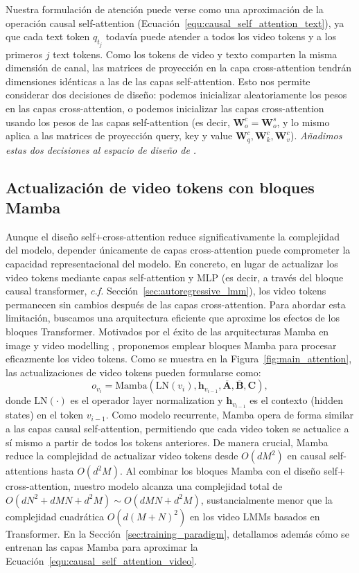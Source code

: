 Nuestra formulación de atención puede verse como una aproximación de la operación causal self-attention (Ecuación~\ref{equ:causal_self_attention_text}), ya que cada text token $q_{t_j}$ todavía puede atender a todos los video tokens y a los primeros $j$ text tokens. Como los tokens de video y texto comparten la misma dimensión de canal, las matrices de proyección en la capa cross-attention tendrán dimensiones idénticas a las de las capas self-attention. Esto nos permite considerar dos decisiones de diseño: podemos inicializar aleatoriamente los pesos en las capas cross-attention, o podemos inicializar las capas cross-attention usando los pesos de las capas self-attention (es decir, $\mathbf{W}_o^c=\mathbf{W}_o^s$, y lo mismo aplica a las matrices de proyección query, key y value $\mathbf{W}_q^c,\mathbf{W}_k^c,\mathbf{W}_v^c$). \textit{Añadimos estas dos decisiones al espacio de diseño de \model.}

\subsection{Actualización de video tokens con bloques Mamba}
Aunque el diseño self$+$cross-attention reduce significativamente la complejidad del modelo, depender únicamente de capas cross-attention puede comprometer la capacidad representacional del modelo. En concreto, en lugar de actualizar los video tokens mediante capas self-attention y MLP (es decir, a través del bloque causal transformer, \textit{c.f.} Sección~\ref{sec:autoregressive_lmm}), los video tokens permanecen sin cambios después de las capas cross-attention. Para abordar esta limitación, buscamos una arquitectura eficiente que aproxime los efectos de los bloques Transformer. Motivados por el éxito de las arquitecturas Mamba \cite{gu2023mamba, dao2024transformers} en image y video modelling \cite{zhu2024vision, liu2024vmamba, li2024videomamba}, proponemos emplear bloques Mamba para procesar eficazmente los video tokens. Como se muestra en la Figura~\ref{fig:main_attention}, las actualizaciones de video tokens pueden formularse como:
\begin{equation}
\label{equ:mamba}
    o_{v_i} = \mathrm{Mamba}(\mathrm{LN}(v_i), \mathbf{h}_{v_{i-1}}, \overline{\mathbf{A}}, \overline{\mathbf{B}}, \mathbf{C}),
\end{equation}
donde $\mathrm{LN}(\cdot)$ es el operador layer normalization y $\mathbf{h}_{v_{i-1}}$ es el contexto (hidden states) en el token $v_{i-1}$. Como modelo recurrente, Mamba opera de forma similar a las capas causal self-attention, permitiendo que cada video token se actualice a sí mismo a partir de todos los tokens anteriores. De manera crucial, Mamba reduce la complejidad de actualizar video tokens desde $O(dM^2)$ en causal self-attentions hasta $O(d^2M)$. Al combinar los bloques Mamba con el diseño self$+$cross-attention, nuestro modelo alcanza una complejidad total de $O(dN^2+dMN+d^2M)\sim O(dMN+d^2M)$, sustancialmente menor que la complejidad cuadrática $O(d(M+N)^2)$ en los video LMMs basados en Transformer. En la Sección~\ref{sec:training_paradigm}, detallamos además cómo se entrenan las capas Mamba para aproximar la Ecuación~\ref{equ:causal_self_attention_video}.

